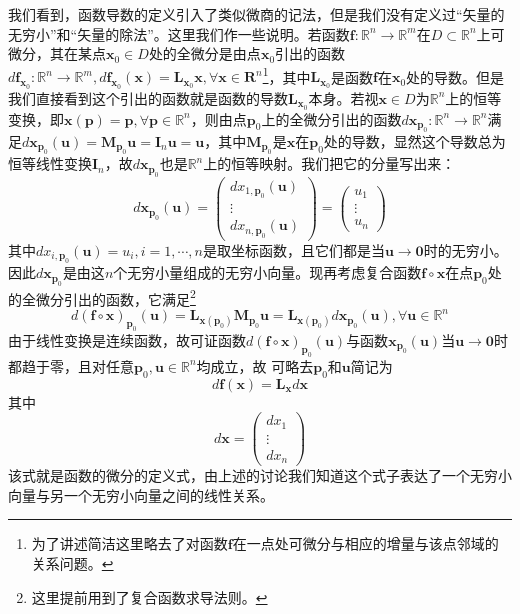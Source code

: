\documentclass[main.tex]{subfiles}
\begin{document}
我们看到，函数导数的定义引入了类似微商的记法，但是我们没有定义过“矢量的无穷小”和“矢量的除法”。这里我们作一些说明。若函数$\mathbf{f}:\mathbb{R}^n\rightarrow\mathbb{R}^m$在$D\subset\mathbb{R}^n$上可微分，其在某点$\mathbf{x}_0\in D$处的全微分是由点$\mathbf{x}_0$引出的函数$d\mathbf{f}_{\mathbf{x}_0}:\mathbb{R}^n\rightarrow\mathbb{R}^m,d\mathbf{f}_{\mathbf{x}_0}\left(\mathbf{x}\right)=\mathbf{L}_{\mathbf{x}_0}\mathbf{x},\forall \mathbf{x}\in\mathbf{R}^n$\footnote{为了讲述简洁这里略去了对函数$\mathbf{f}$在一点处可微分与相应的增量与该点邻域的关系问题。}，其中$\mathbf{L}_{\mathbf{x}_0}$是函数$\mathbf{f}$在$\mathbf{x}_0$处的导数。但是我们直接看到这个引出的函数就是函数的导数$\mathbf{L}_{\mathbf{x}_0}$本身。若视$\mathbf{x}\in D$为$\mathbb{R}^n$上的恒等变换，即$\mathbf{x}\left(\mathbf{p}\right)=\mathbf{p},\forall\mathbf{p}\in\mathbb{R}^n$，则由点$\mathbf{p}_0$上的全微分引出的函数$d\mathbf{x}_{\mathbf{p}_0}:\mathbb{R}^n\rightarrow\mathbb{R}^n$满足$d\mathbf{x}_{\mathbf{p}_0}\left(\mathbf{u}\right)=\mathbf{M}_{\mathbf{p}_0}\mathbf{u}=\mathbf{I}_n\mathbf{u}=\mathbf{u}$，其中$\mathbf{M}_{\mathbf{p}_0}$是$\mathbf{x}$在$\mathbf{p}_0$处的导数，显然这个导数总为恒等线性变换$\mathbf{I}_n$，故$d\mathbf{x}_{\mathbf{p}_0}$也是$\mathbb{R}^n$上的恒等映射。我们把它的分量写出来：
\[
d\mathbf{x}_{\mathbf{p}_0}\left(\mathbf{u}\right)=\left(\begin{array}{c}
dx_{1,\mathbf{p}_0}\left(\mathbf{u}\right)\\
\vdots\\
dx_{n,\mathbf{p}_0}\left(\mathbf{u}\right)\end{array}\right)=\left(\begin{array}{c}
u_1\\\vdots\\u_n\end{array}\right)
\]
其中$dx_{i,\mathbf{p}_0}\left(\mathbf{u}\right)=u_i,i=1,\cdots,n$是取坐标函数，且它们都是当$\mathbf{u}\to\mathbf{0}$时的无穷小。因此$d\mathbf{x}_{\mathbf{p}_0}$是由这$n$个无穷小量组成的无穷小向量。现再考虑复合函数$\mathbf{f}\circ\mathbf{x}$在点$\mathbf{p}_0$处的全微分引出的函数，它满足\footnote{这里提前用到了复合函数求导法则。}
\[
d\left(\mathbf{f}\circ \mathbf{x}\right)_{\mathbf{p}_0}\left(\mathbf{u}\right)=\mathbf{L}_{\mathbf{x}\left(\mathbf{p}_0\right)}\mathbf{M}_{\mathbf{p}_0}\mathbf{u}=\mathbf{L}_{\mathbf{x}\left(\mathbf{p}_0\right)}d\mathbf{x}_{\mathbf{p}_0}\left(\mathbf{u}\right),\forall\mathbf{u}\in\mathbb{R}^n\]
由于线性变换是连续函数，故可证函数$d\left(\mathbf{f}\circ \mathbf{x}\right)_{\mathbf{p}_0}\left(\mathbf{u}\right)$与函数$\mathbf{x}_{\mathbf{p}_0}\left(\mathbf{u}\right)$当$\mathbf{u}\to\mathbf{0}$时都趋于零，且对任意$\mathbf{p}_0,\mathbf{u}\in\mathbb{R}^n$均成立，故
可略去$\mathbf{p}_0$和$\mathbf{u}$简记为
\[d\mathbf{f}\left(\mathbf{x}\right)=\mathbf{L}_\mathbf{x}d\mathbf{x}\]
其中
\[d\mathbf{x}=\left(\begin{array}{c}dx_1\\\vdots\\dx_n\end{array}\right)\]
该式就是函数的微分的定义式，由上述的讨论我们知道这个式子表达了一个无穷小向量与另一个无穷小向量之间的线性关系。
\end{document}
